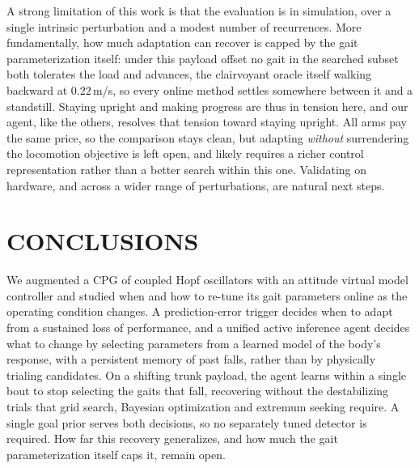 \documentclass[lettersize,journal]{IEEEtran}
\begin{document}
A strong limitation of this work is that the evaluation is in simulation, over a single intrinsic perturbation and a modest number of recurrences.
More fundamentally, how much adaptation can recover is capped by the gait parameterization itself: under this payload offset no gait in the searched subset both tolerates the load and advances, the clairvoyant oracle itself walking backward at $0.22$\,m/s, so every online method settles somewhere between it and a standstill.
Staying upright and making progress are thus in tension here, and our agent, like the others, resolves that tension toward staying upright.
All arms pay the same price, so the comparison stays clean, but adapting \emph{without} surrendering the locomotion objective is left open, and likely requires a richer control representation rather than a better search within this one.
Validating on hardware, and across a wider range of perturbations, are natural next steps.

\section{CONCLUSIONS}
\label{sec:conclusions}

We augmented a CPG of coupled Hopf oscillators with an attitude virtual model controller and studied when and how to re-tune its gait parameters online as the operating condition changes.
A prediction-error trigger decides when to adapt from a sustained loss of performance, and a unified active inference agent decides what to change by selecting parameters from a learned model of the body's response, with a persistent memory of past falls, rather than by physically trialing candidates.
On a shifting trunk payload, the agent learns within a single bout to stop selecting the gaits that fall, recovering without the destabilizing trials that grid search, Bayesian optimization and extremum seeking require.
A single goal prior serves both decisions, so no separately tuned detector is required.
How far this recovery generalizes, and how much the gait parameterization itself caps it, remain open.

\appendices
\end{document}
